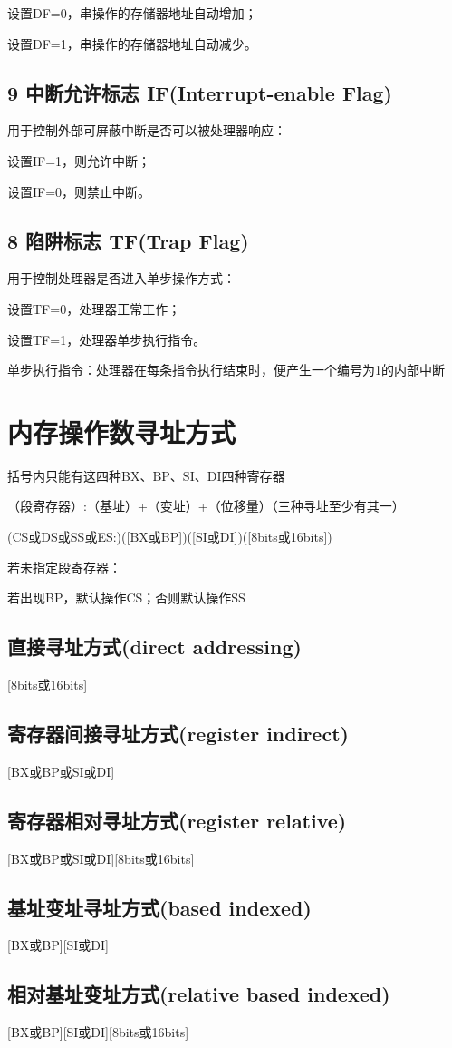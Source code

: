 \documentclass{article}
\begin{document}
设置DF=0，串操作的存储器地址自动增加；

设置DF=1，串操作的存储器地址自动减少。

\subsection{9 中断允许标志 IF(Interrupt-enable Flag)}

用于控制外部可屏蔽中断是否可以被处理器响应：

设置IF=1，则允许中断；

设置IF=0，则禁止中断。

\subsection{8 陷阱标志 TF(Trap Flag)}

用于控制处理器是否进入单步操作方式：

设置TF=0，处理器正常工作；

设置TF=1，处理器单步执行指令。

单步执行指令：处理器在每条指令执行结束时，便产生一个编号为1的内部中断

\section{内存操作数寻址方式}

括号内只能有这四种BX、BP、SI、DI四种寄存器

（段寄存器）:（基址）+（变址）+（位移量）（三种寻址至少有其一）

(CS或DS或SS或ES:)([BX或BP])([SI或DI])([8bits或16bits])

若未指定段寄存器：

若出现BP，默认操作CS；否则默认操作SS

\subsection{直接寻址方式(direct addressing)}

[8bits或16bits]

\subsection{寄存器间接寻址方式(register indirect)}

[BX或BP或SI或DI]

\subsection{寄存器相对寻址方式(register relative)}

[BX或BP或SI或DI][8bits或16bits]

\subsection{基址变址寻址方式(based indexed)}

[BX或BP][SI或DI]

\subsection{相对基址变址方式(relative based indexed)}

[BX或BP][SI或DI][8bits或16bits]
\end{document}

